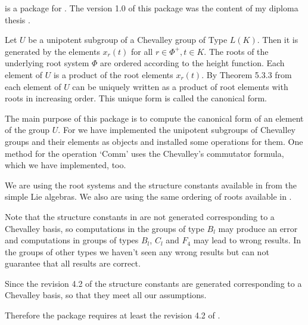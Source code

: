 

{\Unipot} is a package for {} \cite{GAP4}. The  version 1.0
of   this  package  was   the  content  of  my  diploma   thesis
\cite{SH2000}.

Let $U$ be a unipotent  subgroup of  a  Chevalley  group of Type
$L(K)$.  Then it is generated by  the  elements $x_r(t)$ for all
$r\in  \Phi^+,t\in K$. The roots of the underlying  root  system
$\Phi$  are  ordered  according  to  the height  function.  Each
element of  $U$ is  a product of the  root elements $x_r(t)$. By
Theorem 5.3.3 from  \cite{Carter72}  each element of $U$ can  be
uniquely  written  as a product  of root  elements with roots in
increasing order. This unique form is called the canonical form.


The main  purpose  of this  package is to compute the  canonical
form of an element of the group $U$. For we have implemented the
unipotent subgroups  of Chevalley groups and  their elements  as
{\GAP} objects and  installed  some  operations  for  them.  One
method for the operation `Comm'  uses the Chevalley's commutator
formula, which we have implemented, too.



We  are  using  the  root  systems and  the  structure constants
available in {\GAP} from  the simple  Lie algebras. We  also are
using the same ordering of roots available in {\GAP}.

Note that the structure constants in {} are not generated
corresponding  to  a Chevalley  basis, so  computations  in  the
groups of  type $B_l$  may produce an  error and computations in
groups  of  types  $B_l$,  $C_l$  and $F_4$ may  lead  to  wrong
results. In the groups of other types  we haven't seen any wrong
results but can not guarantee that all results are correct.

Since the revision  4.2  of  {\GAP} the  structure constants are
generated corresponding to a  Chevalley basis, so that they meet
all our assumptions.

Therefore  the package  requires at least  the  revision  4.2 of
{\GAP}.

